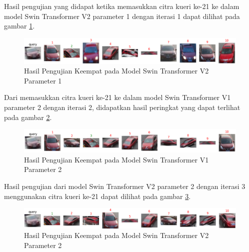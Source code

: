Hasil pengujian yang didapat ketika memasukkan citra kueri ke-21 ke dalam model Swin Transformer V2 parameter 1 dengan 
iterasi 1 dapat dilihat pada gambar \ref{fig:hasilpengujiankeempatpadamodelswintransformerv2param1}.

\begin{figure}[h!]
  \centering
  \includegraphics[scale=0.6]{gambar/Que21V2P1IT1.png}
  \caption{Hasil Pengujian Keempat pada Model Swin Transformer V2 Parameter 1}
  \label{fig:hasilpengujiankeempatpadamodelswintransformerv2param1}
\end{figure}

Dari memasukkan citra kueri ke-21 ke dalam model Swin Transformer V1 parameter 2 dengan iterasi 2, didapatkan hasil 
peringkat yang dapat terlihat pada gambar \ref{fig:hasilpengujiankeempatpadamodelswintransformerv1param2}.

\begin{figure}[h!]
  \centering
  \includegraphics[scale=0.6]{gambar/Que21V1P2IT2.png}
  \caption{Hasil Pengujian Keempat pada Model Swin Transformer V1 Parameter 2}
  \label{fig:hasilpengujiankeempatpadamodelswintransformerv1param2}
\end{figure}

Hasil pengujian dari model Swin Transformer V2 parameter 2 dengan iterasi 3 menggunakan citra kueri ke-21 dapat 
dilihat pada gambar \ref{fig:hasilpengujiankeempatpadamodelswintransformerv2param2}.

\begin{figure}[h!]
  \centering
  \includegraphics[scale=0.6]{gambar/Que21V2P2IT3.png}
  \caption{Hasil Pengujian Keempat pada Model Swin Transformer V2 Parameter 2}
  \label{fig:hasilpengujiankeempatpadamodelswintransformerv2param2}
\end{figure}

